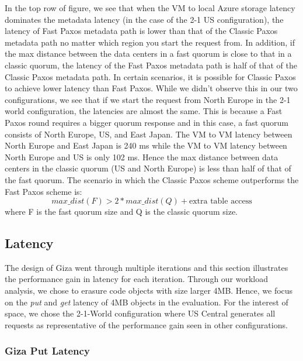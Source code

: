 In the top row of figure, we see that when the VM to local Azure storage latency dominates the metadata latency (in the case of the 2-1 US configuration), the latency of Fast Paxos metadata path is lower than that of the Classic Paxos metadata path no matter which region you start the request from. In addition, if the max distance between the data centers in a fast quorum is close to that in a classic quorum, the latency of the Fast Paxos metadata path is half of that of the Classic Paxos metadata path. In certain scenarios, it is possible for Classic Paxos to achieve lower latency than Fast Paxos. While we didn’t observe this in our two configurations, we see that if we start the request from North Europe in the 2-1 world configuration, the latencies are almost the same. This is because a Fast Paxos round requires a bigger quorum response and in this case, a fast quorum consists of North Europe, US, and East Japan. The VM to VM latency between North Europe and East Japan is 240 ms while the VM to VM latency between North Europe and US is only 102 ms. Hence the max distance between data centers in the classic quorum (US and North Europe) is less than half of that of the fast quorum. The scenario in which the Classic Paxos scheme outperforms the Fast Paxos scheme is:
\[max\_dist(F) > 2 * max\_dist(Q) + \textrm{extra table access}
\]
where F is the fast quorum size and Q is the classic quorum size.


\subsection{\name Latency}
The design of Giza went through multiple iterations and this section illustrates the performance gain in latency for each iteration. Through our workload analysis, we chose to erasure code objects with size larger 4MB. Hence, we focus on the {\em put} and {\em get} latency of 4MB objects in the evaluation. For the interest of space, we chose the 2-1-World configuration where US Central generates all requests as representative of the performance gain seen in other configurations.

\subsubsection{Giza Put Latency}


